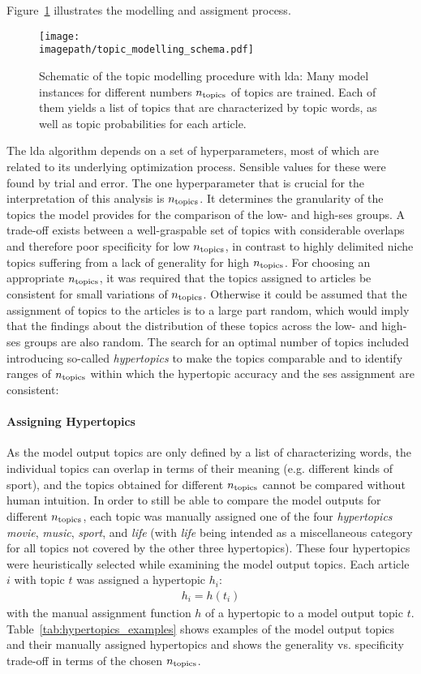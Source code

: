 Figure~\ref{fig:topic_modelling_schema} illustrates the modelling and assigment process.
\begin{figure}
    \centering
    \texttt{[image: \\imagepath/topic\_modelling\_schema.pdf]}
    \caption{Schematic of the topic modelling procedure with \gls{lda}: Many model instances for different numbers $n_\text{topics}$ of topics are trained. Each of them yields a list of topics that are characterized by topic words, as well as topic probabilities for each article.}\label{fig:topic_modelling_schema}
\end{figure}

The \gls{lda} algorithm depends on a set of hyperparameters, most of which are related to its underlying optimization process.  Sensible values for these were found by trial and error. The one hyperparameter that is crucial for the interpretation of this analysis is $n_\text{topics}$. It determines the granularity of the topics the model provides for the comparison of the low- and high-\gls{ses} groups. A trade-off exists between a well-graspable set of topics with considerable overlaps and therefore poor specificity for low $n_\text{topics}$, in contrast to highly delimited niche topics suffering from a lack of generality for high $n_\text{topics}$. For choosing an appropriate $n_\text{topics}$, it was required that the topics assigned to articles be consistent for small variations of $n_\text{topics}$. Otherwise it could be assumed that the assignment of topics to the articles is to a large part random, which would imply that the findings about the distribution of these topics across the low- and high-\gls{ses} groups are also random. The search for an optimal number of topics included introducing so-called \textit{hypertopics} to make the topics comparable and to identify ranges of $n_\text{topics}$ within which the hypertopic accuracy and the \gls{ses} assignment are consistent:

\paragraph{Assigning Hypertopics}
As the model output topics are only defined by a list of characterizing words, the individual topics can overlap in terms of their meaning (e.g. different kinds of sport), and the topics obtained for different $n_\text{topics}$ cannot be compared without human intuition. In order to still be able to compare the model outputs for different $n_\text{topics}$, each topic was manually assigned one of the four \textit{hypertopics} \textit{movie}, \textit{music}, \textit{sport}, and \textit{life} (with \textit{life} being intended as a miscellaneous category for all topics not covered by the other three hypertopics). These four hypertopics were heuristically selected while examining the model output topics. Each article $i$ with topic $t$ was assigned a hypertopic $h_i$:
\begin{align}
    h_i = h(t_i)
\end{align}
with the manual assignment function $h$ of a hypertopic to a model output topic $t$. Table~\ref{tab:hypertopics_examples} shows examples of the model output topics and their manually assigned hypertopics and shows the generality vs. specificity trade-off in terms of the chosen $n_\text{topics}$.

